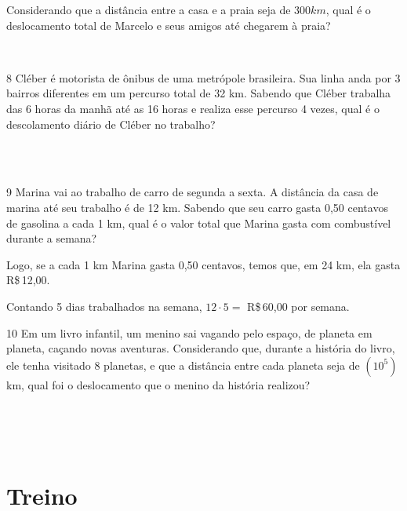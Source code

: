 Considerando que a distância entre a casa e a praia seja de $300 km$, qual
é o deslocamento total de Marcelo e seus amigos até chegarem à praia?

\\

\pagebreak

\num{8} Cléber é motorista de ônibus de uma metrópole brasileira. Sua linha
anda por 3 bairros diferentes em um percurso total de 32 km. Sabendo que
Cléber trabalha das 6 horas da manhã até as 16 horas e realiza esse
percurso 4 vezes, qual é o descolamento diário de Cléber no trabalho?

\\
\\

\num{9} Marina vai ao trabalho de carro de segunda a sexta. A distância da
casa de marina até seu trabalho é de 12 km. Sabendo que seu carro gasta
0,50 centavos de gasolina a cada 1 km, qual é o valor total que Marina
gasta com combustível durante a semana?


Logo, se a cada 1 km Marina gasta 0,50 centavos, temos que, em 24 km,
ela gasta R\$\,12,00.

Contando 5 dias trabalhados na semana, $12 \cdot 5 =$ R\$\,60,00 por semana.

\num{10} Em um livro infantil, um menino sai vagando pelo espaço, de planeta
em planeta, caçando novas aventuras. Considerando que, durante a
história do livro, ele tenha visitado 8 planetas, e que a distância
entre cada planeta seja de $(10^5)$ km, qual foi o deslocamento que o
menino da história realizou?

\\
\\
\\

\pagebreak

\section{Treino}

